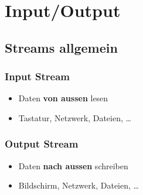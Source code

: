 \section{Input/Output}

\subsection{Streams allgemein}
\vspace{-0.7\abovedisplayskip}
\begin{minipage}[t]{0.5\columnwidth}
    \subsubsection{Input Stream}
    \begin{itemize}
        \item Daten \textbf{von aussen} lesen
        \item Tastatur, Netzwerk, Dateien, \ldots
    \end{itemize}
\end{minipage}\hfill%
\begin{minipage}[t]{0.49\columnwidth}
    \subsubsection{Output Stream}
    \begin{itemize}
        \item Daten \textbf{nach aussen} schreiben
        \item Bildschirm, Netzwerk, Dateien, \ldots
    \end{itemize}
\end{minipage}


